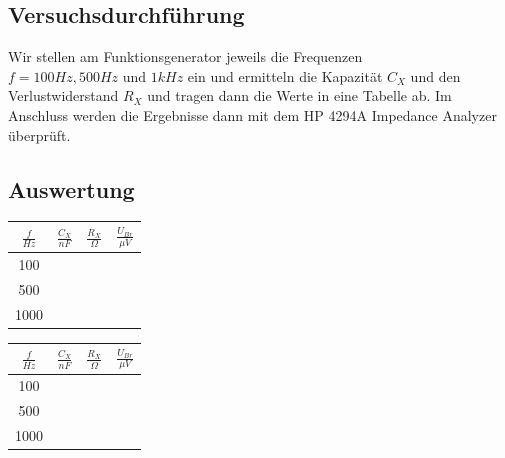 \documentclass{article}
\begin{document}
\subsection{Versuchsdurchführung}
Wir stellen am Funktionsgenerator jeweils die Frequenzen $f= 100Hz, 500Hz\text{ und }1kHz$ ein und ermitteln die Kapazität $C_X$ und den Verlustwiderstand $R_X$
und tragen dann die Werte in eine Tabelle ab. Im Anschluss werden die Ergebnisse dann mit dem HP 4294A Impedance Analyzer überprüft.

\subsection{Auswertung}

\begin{center}
  \begin{tabular}{|c|c|c|c|}
    \hline
    $\frac{f}{Hz}$ & $\frac{C_X}{nF}$ & $\frac{R_X}{\Omega}$ & $\frac{U_{Br}}{\mu V}$ \\
    \hline
    100            &                  &                      &                        \\
    \hline
    500            &                  &                      &                        \\
    \hline
    1000           &                  &                      &                        \\
    \hline
  \end{tabular}
\end{center}
\begin{center}
  \begin{tabular}{|c|c|c|c|}
    \hline
    $\frac{f}{Hz}$ & $\frac{C_X}{nF}$ & $\frac{R_X}{\Omega}$ & $\frac{U_{Br}}{\mu V}$ \\
    \hline
    100            &                  &                      &                        \\
    \hline
    500            &                  &                      &                        \\
    \hline
    1000           &                  &                      &                        \\
    \hline
  \end{tabular}
\end{center}
\end{document}
